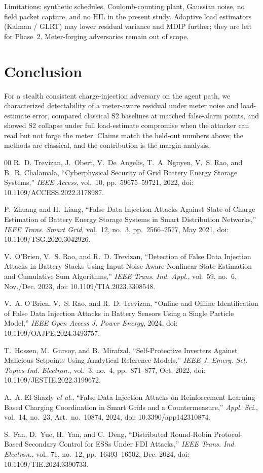\documentclass[conference]{IEEEtran}
\begin{document}
Limitations: synthetic schedules, Coulomb-counting plant, Gaussian noise, no field packet capture, and no HIL in the present study. Adaptive load estimators (Kalman / GLRT) may lower residual variance and MDIP further; they are left for Phase~2. Meter-forging adversaries remain out of scope.

\section{Conclusion}
For a stealth consistent charge-injection adversary on the agent path, we characterized detectability of a meter-aware residual under meter noise and load-estimate error, compared classical S2 baselines at matched false-alarm points, and showed S2 collapse under full load-estimate compromise when the attacker can read but not forge the meter. Claims match the held-out numbers above; the methods are classical, and the contribution is the margin analysis.

\begin{thebibliography}{00}
R.~D. Trevizan, J.~Obert, V.~De~Angelis, T.~A. Nguyen, V.~S. Rao, and B.~R. Chalamala, ``Cyberphysical Security of Grid Battery Energy Storage Systems,'' \textit{IEEE Access}, vol.~10, pp.~59675--59721, 2022, doi: 10.1109/ACCESS.2022.3178987.

P.~Zhuang and H.~Liang, ``False Data Injection Attacks Against State-of-Charge Estimation of Battery Energy Storage Systems in Smart Distribution Networks,'' \textit{IEEE Trans. Smart Grid}, vol.~12, no.~3, pp.~2566--2577, May 2021, doi: 10.1109/TSG.2020.3042926.

V.~O'Brien, V.~S. Rao, and R.~D. Trevizan, ``Detection of False Data Injection Attacks in Battery Stacks Using Input Noise-Aware Nonlinear State Estimation and Cumulative Sum Algorithms,'' \textit{IEEE Trans. Ind. Appl.}, vol.~59, no.~6, Nov./Dec. 2023, doi: 10.1109/TIA.2023.3308548.

V.~A. O'Brien, V.~S. Rao, and R.~D. Trevizan, ``Online and Offline Identification of False Data Injection Attacks in Battery Sensors Using a Single Particle Model,'' \textit{IEEE Open Access J. Power Energy}, 2024, doi: 10.1109/OAJPE.2024.3493757.

T.~Hossen, M.~Gursoy, and B.~Mirafzal, ``Self-Protective Inverters Against Malicious Setpoints Using Analytical Reference Models,'' \textit{IEEE J. Emerg. Sel. Topics Ind. Electron.}, vol.~3, no.~4, pp.~871--877, Oct. 2022, doi: 10.1109/JESTIE.2022.3199672.

A.~A. El-Shazly \textit{et al.}, ``False Data Injection Attacks on Reinforcement Learning-Based Charging Coordination in Smart Grids and a Countermeasure,'' \textit{Appl. Sci.}, vol.~14, no.~23, Art.~no.~10874, 2024, doi: 10.3390/app142310874.

S.~Fan, D.~Yue, H.~Yan, and C.~Deng, ``Distributed Round-Robin Protocol-Based Secondary Control for ESSs Under FDI Attacks,'' \textit{IEEE Trans. Ind. Electron.}, vol.~71, no.~12, pp.~16493--16502, Dec. 2024, doi: 10.1109/TIE.2024.3390733.
\end{thebibliography}
\end{document}
